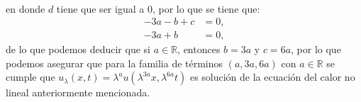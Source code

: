 \begin{homeworkProblem}
\begin{solucion}
\begin{enumerate}
\begin{align*}
        \end{align*}
        en donde $d$ tiene que ser igual a $0$, por lo que se tiene que:
        \begin{align*}
          -3a-b+c&=0,\\
          -3a+b&=0,
        \end{align*}
        de lo que podemos deducir que si $a\in\mathbb{R}$, entonces $b=3a$ y $c=6a$, por lo que podemos asegurar que para la familia de términos $(a,3a,6a)$ con $a\in\mathbb{R}$ se cumple que $u_{\lambda}(x,t)=\lambda^{a}u(\lambda^{3a}x,\lambda^{6a}t)$ es solución de la ecuación del calor no lineal anteriormente mencionada.
        \demostrado
    \end{enumerate}
  \end{solucion}  
\end{homeworkProblem}
